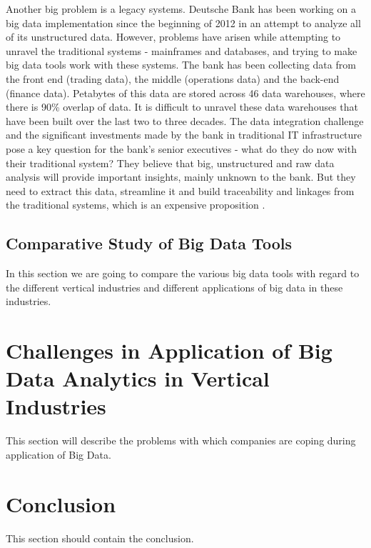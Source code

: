 \documentclass[runningheads]{llncs}
\begin{document}
\begin{enumerate}
Another big problem is a legacy systems. Deutsche Bank has been working on a big data implementation since the beginning of 2012 in an attempt to analyze all of its unstructured data. However, problems have arisen while attempting to unravel the traditional systems - mainframes and databases, and trying to make big data tools work with these systems. The bank has been collecting data from the front end (trading data), the middle (operations data) and the back-end (finance data). Petabytes of this data are stored across 46 data warehouses, where there is 90\% overlap of data. It is difficult to unravel these data warehouses that have been built over the last two to three decades. The data integration challenge and the significant investments made by the bank in traditional IT infrastructure pose a key question for the bank’s senior executives - what do they do now with their traditional system? They believe that big, unstructured and raw data analysis will provide important insights, mainly unknown to the bank. But they need to extract this data, streamline it and build traceability and linkages from the traditional systems, which is an expensive proposition \cite{PREEZ}.

\end{enumerate}

\subsection{Comparative Study of Big Data Tools}
In this section we are going to compare the various big data tools with regard to the different vertical industries and different applications of big data in these industries.

\section{Challenges in Application of Big Data Analytics in Vertical Industries}
This section will describe the problems with which companies are coping during application of Big Data.  

\section{Conclusion}
This section should contain the conclusion.


\end{document}
